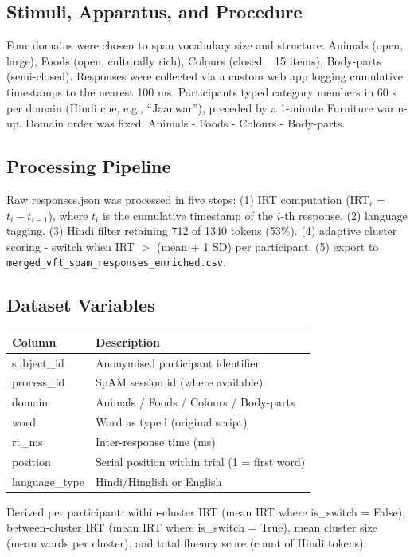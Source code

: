 \documentclass[12pt]{article}
\begin{document}
\subsection{Stimuli, Apparatus, and Procedure}
Four domains were chosen to span vocabulary size and structure: Animals (open, large), Foods (open, culturally rich), Colours (closed, ~15 items), Body-parts (semi-closed). Responses were collected via a custom web app logging cumulative timestamps to the nearest 100 ms. Participants typed category members in 60 s per domain (Hindi cue, e.g., ``Jaanwar''), preceded by a 1-minute Furniture warm-up. Domain order was fixed: Animals - Foods - Colours - Body-parts.

\subsection{Processing Pipeline}
Raw responses.json was processed in five steps: (1) IRT computation (IRT$_i$ = $t_i - t_{i-1}$), where $t_i$ is the cumulative timestamp of the $i$-th response. (2) language tagging. (3) Hindi filter retaining 712 of 1340 tokens (53\%). (4) adaptive cluster scoring - switch when IRT $>$ (mean + 1 SD) per participant. (5) export to \texttt{merged\_vft\_spam\_responses\_enriched.csv}.

\subsection{Dataset Variables}
\begin{center}
\begin{tabular}{ll}
\toprule
Column & Description \\
\midrule
subject\_id & Anonymised participant identifier \\
process\_id & SpAM session id (where available) \\
domain & Animals / Foods / Colours / Body-parts \\
word & Word as typed (original script) \\
rt\_ms & Inter-response time (ms) \\
position & Serial position within trial (1 = first word) \\
language\_type & Hindi/Hinglish or English \\
\bottomrule
\end{tabular}
\end{center}
Derived per participant: within-cluster IRT (mean IRT where is\_switch = False), between-cluster IRT (mean IRT where is\_switch = True), mean cluster size (mean words per cluster), and total fluency score (count of Hindi tokens).
\end{document}
